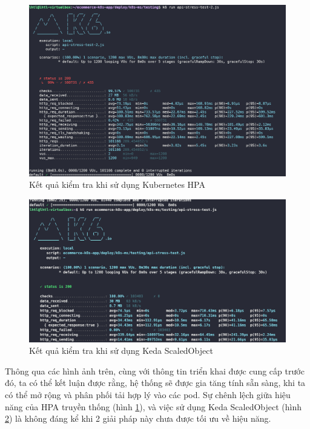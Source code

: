\begin{figure}[H]
  \begin{center}
    \includegraphics[scale=0.63]{images/hanh/component-catalog-hpa-cpu}
  \end{center}
  \caption{Kết quả kiểm tra khi sử dụng Kubernetes HPA}
  \label{fig:component-hpa}

\end{figure}

\begin{figure}[H]
  \begin{center}
    \includegraphics[scale=0.15]{images/hanh/component-catalog-hpa-keda}
  \end{center}
  \caption{Kết quả kiểm tra khi sử dụng Keda ScaledObject}
  \label{fig:component-keda}

\end{figure}

\noindent Thông qua các hình ảnh trên, cùng với thông tin triển khai được cung cấp trước đó, ta có thể kết luận được rằng, hệ thống sẽ được gia tăng tính sẵn sàng, khi ta có thể mở rộng và phân phối tải hợp lý vào các pod. Sự chênh lệch giữa hiệu năng của HPA truyền thống (hình \ref{fig:component-hpa}), và việc sử dụng Keda ScaledObject (hình \ref{fig:component-keda}) là không đáng kể khi 2 giải pháp này chưa được tối ưu về hiệu năng.

